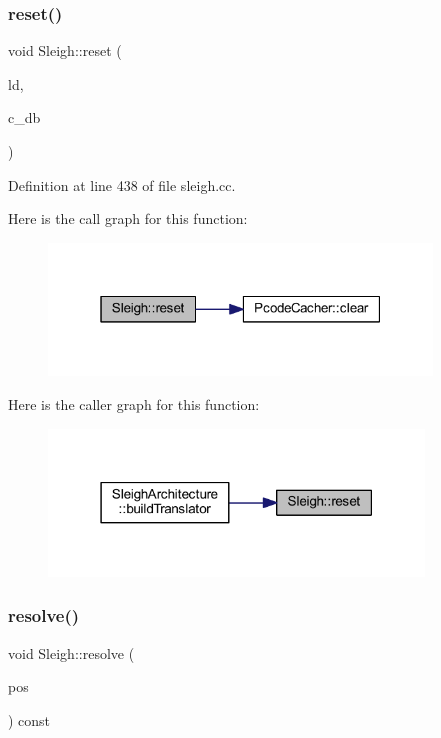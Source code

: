 \subsubsection{\texorpdfstring{reset()}{reset()}}
{\footnotesize\ttfamily void Sleigh\+::reset (\begin{DoxyParamCaption}\item[{\mbox{\hyperlink{class_load_image}{Load\+Image}} $\ast$}]{ld,  }\item[{\mbox{\hyperlink{class_context_database}{Context\+Database}} $\ast$}]{c\+\_\+db }\end{DoxyParamCaption})}



Definition at line 438 of file sleigh.\+cc.

Here is the call graph for this function\+:
\nopagebreak
\begin{figure}[H]
\begin{center}
\leavevmode
\includegraphics[width=289pt]{class_sleigh_a2a9dc927d88ccb1ebece23293fb75b9c_cgraph}
\end{center}
\end{figure}
Here is the caller graph for this function\+:
\nopagebreak
\begin{figure}[H]
\begin{center}
\leavevmode
\includegraphics[width=283pt]{class_sleigh_a2a9dc927d88ccb1ebece23293fb75b9c_icgraph}
\end{center}
\end{figure}
\mbox{\label{class_sleigh_a54c142d4cf4954c6e9f5c32e9e96a215}} 
\subsubsection{\texorpdfstring{resolve()}{resolve()}}
{\footnotesize\ttfamily void Sleigh\+::resolve (\begin{DoxyParamCaption}\item[{\mbox{\hyperlink{class_parser_context}{Parser\+Context}} \&}]{pos }\end{DoxyParamCaption}) const\hspace{0.3cm}{\ttfamily [protected]}}



